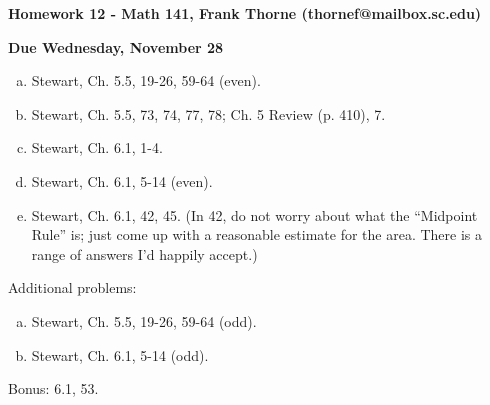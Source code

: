\documentclass[12pt]{article}
\begin{document}
\setlength{\topmargin}{-2mm}





\begin{center}{\bf Homework 12 - Math 141, Frank Thorne (thornef@mailbox.sc.edu)}
\end{center}
\begin{center}
{\bf Due Wednesday, November 28}
\end{center}
\begin{enumerate}[(a)]


\item
Stewart, Ch. 5.5, 19-26, 59-64 (even).

\item
Stewart, Ch. 5.5, 73, 74, 77, 78; Ch. 5 Review (p. 410), 7.

\item
Stewart, Ch. 6.1, 1-4.

\item
Stewart, Ch. 6.1, 5-14 (even).

\item
Stewart, Ch. 6.1, 42, 45. (In 42, do not worry about what the ``Midpoint Rule'' is;
just come up with a reasonable estimate for the area. There is a range of answers
I'd happily accept.)

\end{enumerate}
Additional problems:

\begin{enumerate}[(a)]

\item
Stewart, Ch. 5.5, 19-26, 59-64 (odd).

\item
Stewart, Ch. 6.1, 5-14 (odd).

\end{enumerate}
Bonus: 6.1, 53.
\end{document}
